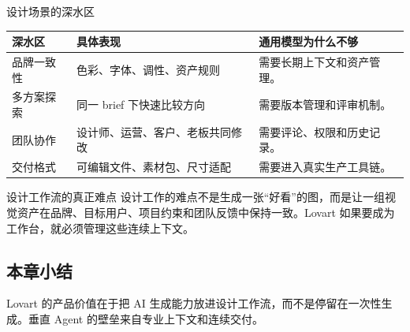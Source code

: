 \begin{knowledgebox}{设计场景的深水区}
\begin{tabularx}{\textwidth}{p{}p{}X}
\toprule
深水区 & 具体表现 & 通用模型为什么不够 \\
\midrule
品牌一致性 & 色彩、字体、调性、资产规则 & 需要长期上下文和资产管理。 \\
多方案探索 & 同一 brief 下快速比较方向 & 需要版本管理和评审机制。 \\
团队协作 & 设计师、运营、客户、老板共同修改 & 需要评论、权限和历史记录。 \\
交付格式 & 可编辑文件、素材包、尺寸适配 & 需要进入真实生产工具链。 \\
\bottomrule
\end{tabularx}
\end{knowledgebox}

\begin{importantbox}{设计工作流的真正难点}
设计工作的难点不是生成一张“好看”的图，而是让一组视觉资产在品牌、目标用户、项目约束和团队反馈中保持一致。Lovart 如果要成为工作台，就必须管理这些连续上下文。
\end{importantbox}

\subsection{本章小结}

Lovart 的产品价值在于把 AI 生成能力放进设计工作流，而不是停留在一次性生成。垂直 Agent 的壁垒来自专业上下文和连续交付。

